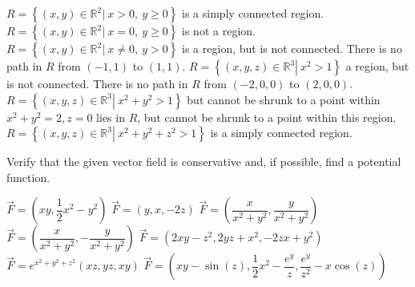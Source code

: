 \begin{Answer}
    
        \Question $R = \left\{ (x,y) \in \mathbb{R}^2 \left| \ x > 0, \ y \geq 0  \right. \right\}$ is a simply connected region.
        \Question $R = \left\{ (x,y) \in \mathbb{R}^2 \left| \ x = 0, \ y \geq 0  \right. \right\}$ is not a region.
        \Question $R = \left\{ (x,y) \in \mathbb{R}^2 \left| \ x \neq 0, \ y > 0  \right. \right\}$ is a region, but is not connected. There is no path in $R$ from $(-1,1)$ to $(1,1)$.
        \Question $R = \left\{ (x,y,z) \in \mathbb{R}^3 \left| \ x^2 > 1  \right. \right\}$ a region, but is not connected. There is no path in $R$ from $(-2,0,0)$ to $(2,0,0)$.
        \Question $R = \left\{ (x,y,z) \in \mathbb{R}^3 \left| \ x^2 + y^2 > 1  \right. \right\}$ but cannot be shrunk to a point within  $x^2+y^2=2, z=0$ lies in $R$, but cannot be shrunk to a point within this region. 
        \Question $R = \left\{ (x,y,z) \in \mathbb{R}^3 \left| \ x^2 + y^2 + z^2 > 1  \right. \right\}$ is a simply connected region.
    
\end{Answer}

\begin{Exercise} Verify that the given vector field is conservative and, if possible, find a potential function.
\begin{multicols}{2}
		\Question[difficulty = 2] $\vec F = \left(xy, \dfrac{1}{2}x^2-y^2 \right)$ %
		\Question[difficulty = 1] $\vec F = \left(y, x, -2z \right)$ %
		\Question[difficulty = 2] $\vec F = \left( \dfrac{x}{x^2+y^2}, \dfrac{y}{x^2+y^2} \right)$ %
		\Question[difficulty = 1] $\vec F = \left( \dfrac{x}{x^2+y^2}, -\dfrac{y}{x^2+y^2} \right)$ %
		\Question[difficulty = 1] $\vec F = \left( 2xy-z^2, 2yz+x^2, -2zx+y^2\right)$ %
		\Question[difficulty = 2] $\vec F = e^{x^2+y^2+z^2}\left( xz, yz, xy\right)$ %
		\Question[difficulty = 2] $\vec F = \left( xy - \sin (z), \dfrac{1}{2}x^2 - \dfrac{e^y}{z}, \dfrac{e^y}{z^2} - x \cos (z)\right)$ %
		\EndCurrentQuestion
\end{multicols}
\end{Exercise}


